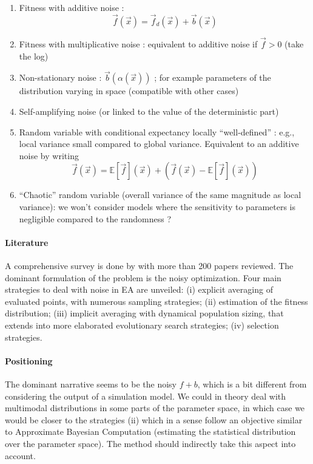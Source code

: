 \begin{enumerate}
\item Fitness with additive noise :
\[
\vec{f}(\vec{x}) = \vec{f}_d(\vec{x}) + \vec{b}(\vec{x})
\]
\item Fitness with multiplicative noise : equivalent to additive noise if $\vec{f} > 0$ (take the log)
\item Non-stationary noise : $\vec{b}(\alpha(\vec{x}))$ ; for example parameters of the distribution varying in space (compatible with other cases)
\item Self-amplifying noise (or linked to the value of the deterministic part)
\item Random variable with conditional expectancy locally ``well-defined'' : e.g., local variance small compared to global variance. Equivalent to an additive noise by writing
\[
\vec{f}(\vec{x}) = \mathbb{E}\left[\vec{f}\right](\vec{x}) + \left(\vec{f}(\vec{x}) - \mathbb{E}\left[\vec{f}\right](\vec{x})\right)
\]
\item ``Chaotic'' random variable (overall variance of the same magnitude as local variance): we won't consider models where the sensitivity to parameters is negligible compared to the randomness ?
\end{enumerate}

\paragraph{Literature}

A comprehensive survey is done by \cite{rakshit2017noisy} with more than 200 papers reviewed. The dominant formulation of the problem is the noisy optimization. Four main strategies to deal with noise in EA are unveiled: (i) explicit averaging of evaluated points, with numerous sampling strategies; (ii) estimation of the fitness distribution; (iii) implicit averaging with dynamical population sizing, that extends into more elaborated evolutionary search strategies; (iv) selection strategies.

\paragraph{Positioning}

The dominant narrative seems to be the noisy $f + b$, which is a bit different from considering the output of a simulation model. We could in theory deal with multimodal distributions in some parts of the parameter space, in which case we would be closer to the strategies (ii) which in a sense follow an objective similar to Approximate Bayesian Computation \cite{10.1371/journal.pcbi.1002803} (estimating the statistical distribution over the parameter space). The method should indirectly take this aspect into account.

